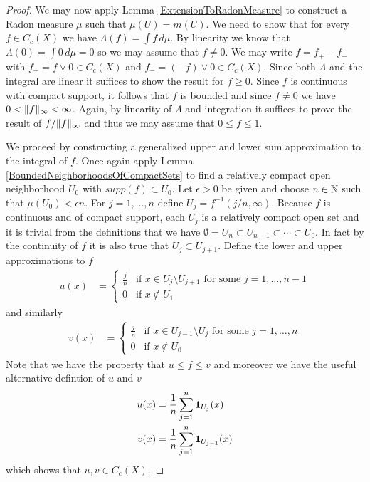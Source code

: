 \begin{proof}
We may now apply Lemma \ref{ExtensionToRadonMeasure} to construct a
Radon measure $\mu$ such that $\mu(U) = m(U)$.  We need to show that
for every $f \in C_c(X)$ we have $\Lambda(f) = \int f \, d\mu$. By
linearity we know that $\Lambda(0) = \int 0 \, d\mu = 0$ so we may
assume that $f \neq 0$.  We may write $f = f_+
- f_-$ with $f_+ = f \vee 0 \in C_c(X)$ and $f_- = (-f) \vee 0 \in
C_c(X)$.  Since both $\Lambda$ and the integral are linear it suffices
to show the result for $f \geq 0$.  Since $f$ is continuous with
compact support, it follows that $f$ is bounded and since $f \neq 0$
we have $0 < \lVert f \rVert_\infty < \infty$.  Again, by linearity of
$\Lambda$ and integration it suffices to prove the result of
$f/\lVert f \rVert_\infty$ and thus we may assume that $0 \leq f \leq 1$.

We proceed by constructing a generalized upper and lower sum
approximation to the integral of $f$.  Once again apply Lemma
\ref{BoundedNeighborhoodsOfCompactSets} to find a relatively compact
open neighborhood $U_0$ with $supp(f) \subset U_0$.  Let $\epsilon >
0$ be given and choose $n \in \mathbb{N}$ such that $\mu(U_0) <
\epsilon n$.  For $j=1, \dotsc, n$ define $U_j = f^{-1} (j/n,
\infty)$.  Because $f$ is continuous and of compact support, each
$U_j$ is a relatively compact open set and it is trivial from the
definitions that we have $\emptyset = U_n \subset U_{n-1} \subset \dotsb \subset
U_0$.  In fact by the continuity of $f$ it is also true that $\overline{U}_j \subset U_{j+1}$.
Define the lower and upper approximations to $f$
\begin{align*}
u(x) &= \begin{cases}
\frac{j}{n} & \text{if $x \in U_j \setminus U_{j+1}$ for some $j=1, \dotsc,  n-1$} \\
0 & \text{if $x \notin U_1$}
\end{cases}
\end{align*}
 and similarly 
\begin{align*}
v(x) &= \begin{cases}
\frac{j}{n} & \text{if $x \in U_{j-1} \setminus U_{j}$ for some
  $j=1,  \dotsc,  n$} \\
0 & \text{if $x \notin U_0$}
\end{cases}
\end{align*}
Note that we have the property that $u \leq f \leq v$ and moreover we
have the useful alternative defintion of $u$ and $v$
\begin{align*}
u(x) &= \frac{1}{n} \sum_{j=1}^n \textbf{1}_{U_j}(x) \\
v(x) &= \frac{1}{n} \sum_{j=1}^{n} \textbf{1}_{U_{j-1}}(x) \\
\end{align*}
which shows that $u,v \in C_c(X)$.


\end{proof}
